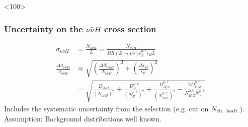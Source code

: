 \begin{frame}<100>
  \frametitle{Uncertainty on the \texorpdfstring{{$\nu\bar{\nu}H$}}{vvH} cross section}
  \begin{align*}
    \sigma_{\nu\bar{\nu}H} &= \frac{N_{\nu\bar{\nu}H}}{L}
        = \frac{N_{\nu\bar{\nu}H}}
               {BR(Z\rightarrow \nu\bar{\nu})\epsilon_Z^{\mu, e} \epsilon_H L}
    \\
    \frac{ \Delta\sigma_{\nu\bar{\nu}H} }{ \sigma_{\nu\bar{\nu}H} }
    &\approx \sqrt{ \left( \frac{ \Delta N_{\nu\bar{\nu}H} }
                                { N_{\nu\bar{\nu}H}} \right)^2
                 +  \left( \frac{ \Delta \epsilon_H }{ \epsilon_H} \right)^2 }
    \\
    &= \sqrt{ \frac{ D_{\nu\bar{\nu}H} }{ (N_{\nu\bar{\nu}H})^2 }
            + \frac{ D_{Z}^{\mu, e} }{ (N_{Z}^{\mu, e})^2 }
            + \frac{ D_{H|Z}^{\mu, e} }{ (N_{H|Z}^{\mu, e})^2 }
            - \frac{ 2 D_{H|Z}^{\mu, e} }{ N_{H|Z}^{\mu, e} N_{Z}^{\mu, e} } }
    \end{align*}
    Includes the systematic uncertainty from the selection
    (e.g. cut on $N_{\textnormal{ch. hadr.}}$). \\
    Assumption: Background distributions well known. \\
  \end{frame}

